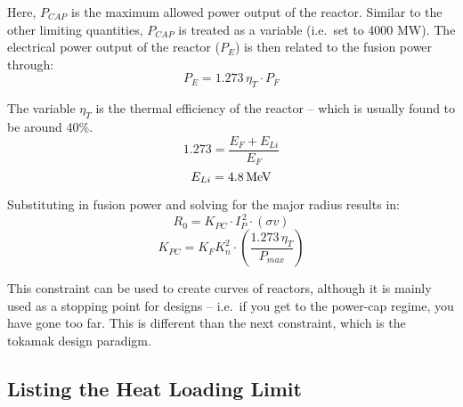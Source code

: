 Here, $P_{CAP}$ is the maximum allowed power output of the reactor. Similar to the other limiting quantities, $P_{CAP}$ is treated as a  variable (i.e.\ set to 4000 MW). The electrical power output of the reactor ($P_E$) is then related to the fusion power through: \cite{jeff}
\begin{equation}
	P_E = 1.273 \, \eta_T \cdot P_F
\end{equation}

 The variable $\eta_T$ is the thermal efficiency of the reactor -- which is usually found to be around 40\%. 
\begin{equation}
	1.273 = \frac{ E_F + E_{Li} }{ E_F }
\end{equation}
\begin{equation}
	E_{Li} = 4.8 \, \textnormal{MeV}
\end{equation}

Substituting in fusion power and solving for the major radius results in:
\begin{equation}
	\label{eq:r_pcap}
	R_0 = K_{PC} \cdot I_P^{\,2} \cdot (\sigma v)
\end{equation}
\begin{equation}
	K_{PC} = K_F K_n^2 \cdot \left( \frac{ 1.273 \, \eta_T }{ P_{max} } \right)
\end{equation}

This  constraint can be used to create curves of reactors, although it is mainly used as a stopping point for designs -- i.e.\ if you get to the power-cap regime, you have gone too far. This is different than the next constraint, which is  the  tokamak design paradigm.

\subsection{Listing the Heat Loading Limit}

